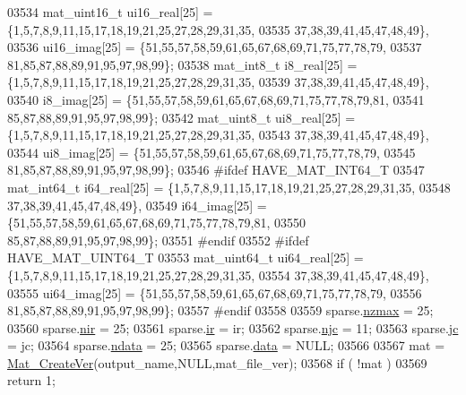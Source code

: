 \begin{DoxyCode}
{{{{{{{{{{{{{{{{{{{{{{{{{{{{{{{{{{{{{{{{{{{{{{{{{{{{{{{{{{{{03534     mat\_uint16\_t ui16\_real[25] = \{1,5,7,8,9,11,15,17,18,19,21,25,27,28,29,31,35,
03535                                   37,38,39,41,45,47,48,49\},
03536                  ui16\_imag[25] = \{51,55,57,58,59,61,65,67,68,69,71,75,77,78,79,
03537                                   81,85,87,88,89,91,95,97,98,99\};
03538     mat\_int8\_t i8\_real[25] = \{1,5,7,8,9,11,15,17,18,19,21,25,27,28,29,31,35,
03539                               37,38,39,41,45,47,48,49\},
03540                i8\_imag[25] = \{51,55,57,58,59,61,65,67,68,69,71,75,77,78,79,81,
03541                               85,87,88,89,91,95,97,98,99\};
03542     mat\_uint8\_t ui8\_real[25] = \{1,5,7,8,9,11,15,17,18,19,21,25,27,28,29,31,35,
03543                                 37,38,39,41,45,47,48,49\},
03544                 ui8\_imag[25] = \{51,55,57,58,59,61,65,67,68,69,71,75,77,78,79,
03545                                 81,85,87,88,89,91,95,97,98,99\};
03546 \textcolor{preprocessor}{#ifdef HAVE\_MAT\_INT64\_T}
03547     mat\_int64\_t i64\_real[25] = \{1,5,7,8,9,11,15,17,18,19,21,25,27,28,29,31,35,
03548                                 37,38,39,41,45,47,48,49\},
03549                 i64\_imag[25] = \{51,55,57,58,59,61,65,67,68,69,71,75,77,78,79,81,
03550                                 85,87,88,89,91,95,97,98,99\};
03551 \textcolor{preprocessor}{#endif}
03552 \textcolor{preprocessor}{#ifdef HAVE\_MAT\_UINT64\_T}
03553     mat\_uint64\_t ui64\_real[25] = \{1,5,7,8,9,11,15,17,18,19,21,25,27,28,29,31,35,
03554                                   37,38,39,41,45,47,48,49\},
03555                  ui64\_imag[25] = \{51,55,57,58,59,61,65,67,68,69,71,75,77,78,79,
03556                                   81,85,87,88,89,91,95,97,98,99\};
03557 \textcolor{preprocessor}{#endif}
03558 
03559     sparse.\hyperlink{group___m_a_t_ad79471861cb948e32671be6d4089173a}{nzmax} = 25;
03560     sparse.\hyperlink{group___m_a_t_aa64636ad57cf87f7a28ff5018437a850}{nir}   = 25;
03561     sparse.\hyperlink{group___m_a_t_a8d4c863d704edddec5cbfa15b2d719c8}{ir}    = ir;
03562     sparse.\hyperlink{group___m_a_t_a482d8e4b40aa975f0c1daf146ebe08a4}{njc}   = 11;
03563     sparse.\hyperlink{group___m_a_t_ad1e74cdc4f7eff1e47a670297c01da4b}{jc}    = jc;
03564     sparse.\hyperlink{group___m_a_t_a1beb8a8c58a808207cbea650563a9b63}{ndata} = 25;
03565     sparse.\hyperlink{group___m_a_t_ae2c648cb9eac4ce47f26cddb44246152}{data}  = NULL;
03566 
03567     mat = \hyperlink{group___m_a_t_ga22d404f203af7869c841400e7ad247cf}{Mat\_CreateVer}(output\_name,NULL,mat\_file\_ver);
03568     \textcolor{keywordflow}{if} ( !mat )
03569         \textcolor{keywordflow}{return} 1;
}}}}}}}}}}}}}}}}}}}}}}}}}}}}}}}}}}}}}}}}}}}}}}}}}}}}}}}}}}}}
\end{DoxyCode}
